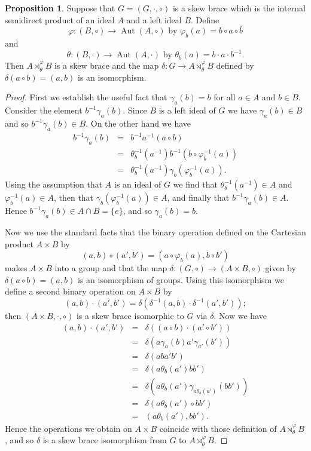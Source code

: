 \documentclass[12pt,a4paper, reqno]{amsart}
\theoremstyle{definition}
\newtheorem{proposition}[theorem]{Proposition}
\renewcommand{\bar}{\overline}
\DeclareMathOperator{\Aut}{\mbox{Aut}}
\begin{document}
\begin{proposition}
Suppose that $ G = (G,\cdot,\circ) $ is a skew brace which is the internal semidirect product of an ideal $ A $ and a left ideal $ B $. Define 
\[ \varphi : (B,\circ) \rightarrow \Aut(A,\circ) \mbox{ by } \varphi_{b}(a) = b \circ a \circ \bar{b} \]
and
\[ \theta : (B,\cdot) \rightarrow \Aut(A,\cdot) \mbox{ by } \theta_{b}(a) = b \cdot a \cdot b^{-1}. \]
Then $ A \rtimes_{\theta}^{\varphi} B $ is a skew brace and the map $ \delta : G \rightarrow A \rtimes_{\theta}^{\varphi} B $ defined by $ \delta(a \circ b) = (a,b) $ is an isomorphism.
\end{proposition}
\begin{proof}
First we establish the useful fact that $ \gamma_{a}(b) = b $ for all $ a \in A $ and $ b \in B $. Consider the element $ b^{-1}\gamma_{a}(b) $. Since $ B $ is a left ideal of $ G $ we have $ \gamma_{a}(b) \in B $ and so $ b^{-1}\gamma_{a}(b) \in B $. On the other hand we have
\begin{eqnarray*}
b^{-1}\gamma_{a}(b) & = & b^{-1}a^{-1}(a \circ b) \\
& = & \theta_{b}^{-1}(a^{-1}) b^{-1} ( b \circ \varphi_{b}^{-1}(a)) \\
& = & \theta_{b}^{-1}(a^{-1}) \gamma_{b}(\varphi_{b}^{-1}(a)). 
\end{eqnarray*}
Using the assumption that $ A $ is an ideal of $ G $ we find that $ \theta_{b}^{-1}(a^{-1}) \in A $ and $ \varphi_{b}^{-1}(a) \in A $, then that $ \gamma_{b}(\varphi_{b}^{-1}(a)) \in A $, and finally that $ b^{-1} \gamma_{a}(b)  \in A $. Hence $ b^{-1} \gamma_{a}(b) \in A \cap B = \{ e \} $, and so $ \gamma_{a}(b)= b $. 

Now we use the standard facts that the binary operation defined on the Cartesian product $ A \times B $ by 
\[ (a,b)\circ (a',b') = (a \circ \varphi_{b}(a), b \circ b') \]
makes $ A \times B $ into a group and that the map $ \delta : (G,\circ) \rightarrow (A \times B,\circ) $ given by $ \delta(a \circ b) = (a,b) $ is an isomorphism of groups. Using this isomorphism we define a second binary operation on $ A \times B $ by 
\[ (a,b)\cdot (a',b') = \delta ( \delta^{-1}(a,b) \cdot \delta^{-1}(a',b') ); \] 
then $ (A \times B, \cdot, \circ) $ is a skew brace isomorphic to $ G $ via $ \delta $. Now we have
\begin{eqnarray*}
(a,b) \cdot (a',b') & = & \delta( (a \circ b) \cdot (a' \circ b') ) \\
& = & \delta( a\gamma_{a}(b)a'\gamma_{a'}(b')) \\
& = & \delta( a b a' b' ) \\
& = & \delta( a \theta_{b}(a') bb' ) \\
& = & \delta( a \theta_{b}(a') \gamma_{a\theta_{b}(a')}(bb') ) \\
& = & \delta (a \theta_{b}(a') \circ bb') \\
& = & (a \theta_{b}(a'),bb').
\end{eqnarray*}
Hence the operations we obtain on $ A \times B $ coincide with those definition of $ A \rtimes_{\theta}^{\varphi} B $, and so $ \delta $ is a skew brace isomorphism from $ G $ to  $ A \rtimes_{\theta}^{\varphi} B $.
\end{proof}
\end{document}
